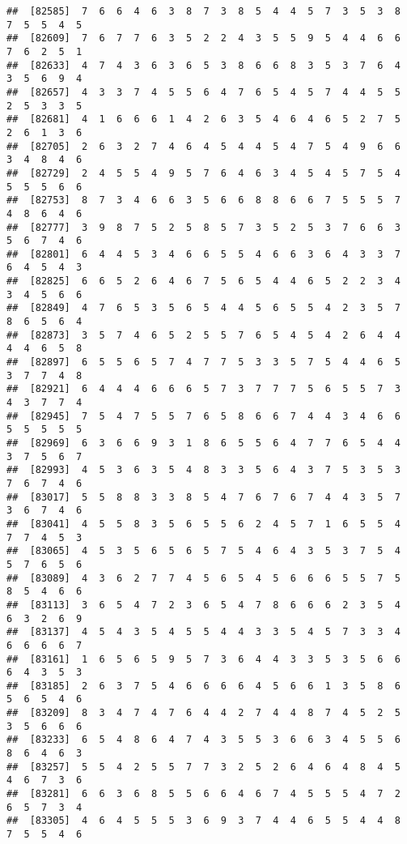\documentclass[
]{book}
\begin{document}
\begin{verbatim}
##  [82585]  7  6  6  4  6  3  8  7  3  8  5  4  4  5  7  3  5  3  8  7  5  5  4  5
##  [82609]  7  6  7  7  6  3  5  2  2  4  3  5  5  9  5  4  4  6  6  7  6  2  5  1
##  [82633]  4  7  4  3  6  3  6  5  3  8  6  6  8  3  5  3  7  6  4  3  5  6  9  4
##  [82657]  4  3  3  7  4  5  5  6  4  7  6  5  4  5  7  4  4  5  5  2  5  3  3  5
##  [82681]  4  1  6  6  6  1  4  2  6  3  5  4  6  4  6  5  2  7  5  2  6  1  3  6
##  [82705]  2  6  3  2  7  4  6  4  5  4  4  5  4  7  5  4  9  6  6  3  4  8  4  6
##  [82729]  2  4  5  5  4  9  5  7  6  4  6  3  4  5  4  5  7  5  4  5  5  5  6  6
##  [82753]  8  7  3  4  6  6  3  5  6  6  8  8  6  6  7  5  5  5  7  4  8  6  4  6
##  [82777]  3  9  8  7  5  2  5  8  5  7  3  5  2  5  3  7  6  6  3  5  6  7  4  6
##  [82801]  6  4  4  5  3  4  6  6  5  5  4  6  6  3  6  4  3  3  7  6  4  5  4  3
##  [82825]  6  6  5  2  6  4  6  7  5  6  5  4  4  6  5  2  2  3  4  3  4  5  6  6
##  [82849]  4  7  6  5  3  5  6  5  4  4  5  6  5  5  4  2  3  5  7  8  6  5  6  4
##  [82873]  3  5  7  4  6  5  2  5  5  7  6  5  4  5  4  2  6  4  4  4  4  6  5  8
##  [82897]  6  5  5  6  5  7  4  7  7  5  3  3  5  7  5  4  4  6  5  3  7  7  4  8
##  [82921]  6  4  4  4  6  6  6  5  7  3  7  7  7  5  6  5  5  7  3  4  3  7  7  4
##  [82945]  7  5  4  7  5  5  7  6  5  8  6  6  7  4  4  3  4  6  6  5  5  5  5  5
##  [82969]  6  3  6  6  9  3  1  8  6  5  5  6  4  7  7  6  5  4  4  3  7  5  6  7
##  [82993]  4  5  3  6  3  5  4  8  3  3  5  6  4  3  7  5  3  5  3  7  6  7  4  6
##  [83017]  5  5  8  8  3  3  8  5  4  7  6  7  6  7  4  4  3  5  7  3  6  7  4  6
##  [83041]  4  5  5  8  3  5  6  5  5  6  2  4  5  7  1  6  5  5  4  7  7  4  5  3
##  [83065]  4  5  3  5  6  5  6  5  7  5  4  6  4  3  5  3  7  5  4  5  7  6  5  6
##  [83089]  4  3  6  2  7  7  4  5  6  5  4  5  6  6  6  5  5  7  5  8  5  4  6  6
##  [83113]  3  6  5  4  7  2  3  6  5  4  7  8  6  6  6  2  3  5  4  6  3  2  6  9
##  [83137]  4  5  4  3  5  4  5  5  4  4  3  3  5  4  5  7  3  3  4  6  6  6  6  7
##  [83161]  1  6  5  6  5  9  5  7  3  6  4  4  3  3  5  3  5  6  6  6  4  3  5  3
##  [83185]  2  6  3  7  5  4  6  6  6  6  4  5  6  6  1  3  5  8  6  5  6  5  4  6
##  [83209]  8  3  4  7  4  7  6  4  4  2  7  4  4  8  7  4  5  2  5  3  5  6  6  6
##  [83233]  6  5  4  8  6  4  7  4  3  5  5  3  6  6  3  4  5  5  6  8  6  4  6  3
##  [83257]  5  5  4  2  5  5  7  7  3  2  5  2  6  4  6  4  8  4  5  4  6  7  3  6
##  [83281]  6  6  3  6  8  5  5  6  6  4  6  7  4  5  5  5  4  7  2  6  5  7  3  4
##  [83305]  4  6  4  5  5  5  3  6  9  3  7  4  4  6  5  5  4  4  8  7  5  5  4  6

\end{verbatim}
\end{document}
